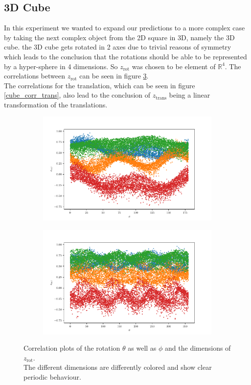 \documentclass[10pt,a4paper]{article}
\newcommand{\rot}{\ensuremath{\text{rot}\xspace}}
\newcommand{\trans}{\ensuremath{\text{trans}\xspace}}
\begin{document}
\subsection{3D Cube}\label{Cube}
In this experiment we wanted to expand our predictions to a more complex case by taking the next complex object from the 2D square in 3D, namely the 3D cube. the 3D cube gets rotated in 2 axes due to trivial reasons of symmetry which leads to the conclusion that the rotations should be able to be represented by a hyper-sphere in 4 dimensions. So $z_{\rot}$ was chosen to be element of $\mathbb{R}^4$. The correlations between $z_{\rot}$ can be seen in figure \ref{cube_corr_rot}. \\
The correlations for the translation, which can be seen in figure \ref{cube_corr_trans}, also lead to the conclusion of $z_{\trans}$ being a linear transformation of the translations. 
\begin{figure}[!ht]
\centering
\begin{subfigure}{0.49\textwidth}
	\centering
	\includegraphics[width=\textwidth] {cube_rot_phi_z_all.pdf}
	\caption{}
	\label{fig_rotph_all}
\end{subfigure}
\begin{subfigure}{0.49\textwidth}
	\centering	
	\includegraphics[width=\textwidth]{cube_rot_theta_z_all.pdf}
	\caption{}
	\label{fig_rotth_all}
\end{subfigure}
\caption{Correlation plots of the rotation $\theta$ as well as $\phi$ and the dimensions of $z_{\rot}$.\\
The different dimensions are differently colored and show clear periodic behaviour.} \label{cube_corr_rot}
\end{figure}
\end{document}
